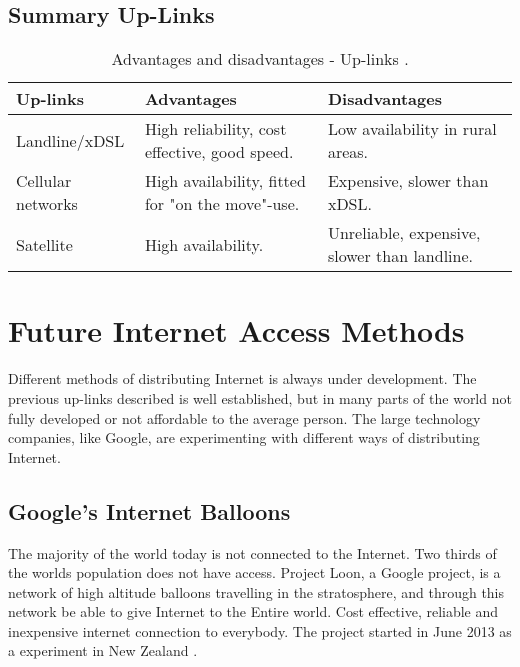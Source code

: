 \subsection{Summary Up-Links}

\begin{center}
\begin{table}[!h]
\caption{\label{tab:uplinks}Advantages and disadvantages - Up-links \cite{comparisonuplinks}.}
    \begin{tabular}{ | l | p{4cm} | p{5cm} |}
    \hline
    \textbf{Up-links} & \textbf{Advantages} & \textbf{Disadvantages} \\ 
    \hline
    Landline/xDSL & High reliability, cost effective, good speed. & Low availability in rural areas. \\ 
    \hline
     Cellular networks & High availability, fitted for "on the move"-use. & Expensive, slower than xDSL.\\
    \hline
    Satellite & High availability.  & Unreliable, expensive, slower than landline.\\ 
    \hline
    \end{tabular}
   \end{table}
\end{center}


\section{Future Internet Access Methods}
Different methods of distributing Internet is always under development. The previous up-links described is well established, but in many parts of the world not fully developed or not affordable to the average person. The large technology companies, like Google, are experimenting with different ways of distributing Internet. 

\subsection{Google's Internet Balloons}
The majority of the world today is not connected to the Internet. Two thirds of the worlds population does not have access. Project Loon, a Google project, is a network of high altitude balloons travelling in the stratosphere, and through this network be able to give Internet to the Entire world. Cost effective, reliable and inexpensive internet connection to everybody. The project started in June 2013 as a experiment in New Zealand \cite{loon}. 

